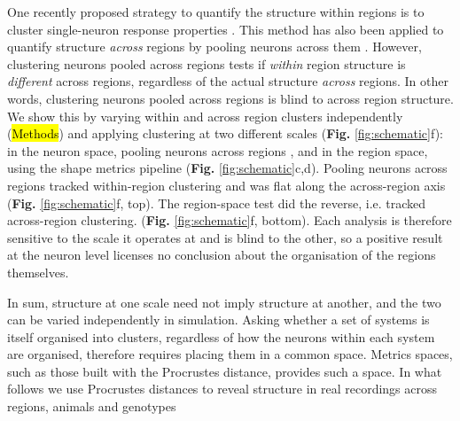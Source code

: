 
 
One recently proposed strategy to quantify the structure within regions is to cluster single-neuron response properties \parencite{posani2026}. This method has also been applied to quantify structure \textit{across} regions by pooling neurons across them \parencite{posani2026}. However, clustering neurons pooled across regions tests if \textit{within} region structure is \textit{different} across regions, regardless of the actual structure \textit{across} regions. In other words, clustering neurons pooled across regions is blind to across region structure. We show this by varying within and across region clusters independently (\hl{Methods}) and applying clustering at two different scales (\textbf{Fig.} \ref{fig:schematic}f): in the neuron space, pooling neurons across regions \parencite{posani2026}, and in the region space, using the shape metrics pipeline (\textbf{Fig.} \ref{fig:schematic}c,d). Pooling neurons across regions tracked within-region clustering and was flat along the across-region axis (\textbf{Fig.} \ref{fig:schematic}f, top). The region-space test did the reverse, i.e. tracked across-region clustering. (\textbf{Fig.} \ref{fig:schematic}f, bottom). Each analysis is therefore sensitive to the scale it operates at and is blind to the other, so a positive result at the neuron level licenses no conclusion about the organisation of the regions themselves.

In sum, structure at one scale need not imply structure at another, and the two can be varied independently in simulation. Asking whether a set of systems is itself organised into clusters, regardless of how the neurons within each system are organised, therefore requires placing them in a common space. Metrics spaces, such as those built with the Procrustes distance, provides such a space. In what follows we use Procrustes distances to reveal structure in real recordings across regions, animals and genotypes
 
